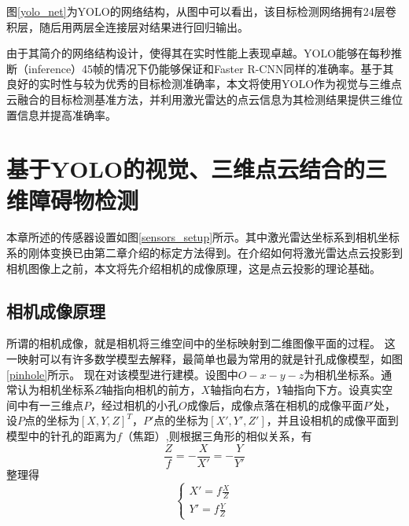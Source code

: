 
图\ref{yolo_net}为YOLO的网络结构，从图中可以看出，该目标检测网络拥有24层卷积层，随后用两层全连接层对结果进行回归输出。

由于其简介的网络结构设计，使得其在实时性能上表现卓越。YOLO能够在每秒推断（inference）45帧的情况下仍能够保证和Faster R-CNN同样的准确率。基于其良好的实时性与较为优秀的目标检测准确率，本文将使用YOLO作为视觉与三维点云融合的目标检测基准方法，并利用激光雷达的点云信息为其检测结果提供三维位置信息并提高准确率。

\section{基于YOLO的视觉、三维点云结合的三维障碍物检测}
本章所述的传感器设置如图\ref{sensors_setup}所示。其中激光雷达坐标系到相机坐标系的刚体变换已由第二章介绍的标定方法得到。在介绍如何将激光雷达点云投影到相机图像上之前，本文将先介绍相机的成像原理，这是点云投影的理论基础。


\subsection{相机成像原理}

所谓的相机成像，就是相机将三维空间中的坐标映射到二维图像平面的过程。
这一映射可以有许多数学模型去解释，最简单也最为常用的就是针孔成像模型，如图\ref{pinhole}所示。
现在对该模型进行建模。设图中$O-x-y-z$为相机坐标系。通常认为相机坐标系$Z$轴指向相机的前方，$X$轴指向右方，$Y$轴指向下方。设真实空间中有一三维点$P$，经过相机的小孔$O$成像后，成像点落在相机的成像平面$P'$处，设$P$点的坐标为$[X, Y, Z]^T$，$P'$点的坐标为$[X', Y', Z']$，并且设相机的成像平面到模型中的针孔的距离为$f$（焦距）,则根据三角形的相似关系，有
\begin{equation}
    \frac{Z}{f}=-\frac{X}{X'}=-\frac{Y}{Y'}
\end{equation}
整理得
\begin{equation}
\left\{
    \begin{split}
        X'=f\frac{X}{Z} \\
        Y'=f\frac{Y}{Z}  
    \end{split}
\right.
\label{eq:pinhole}
\end{equation}

